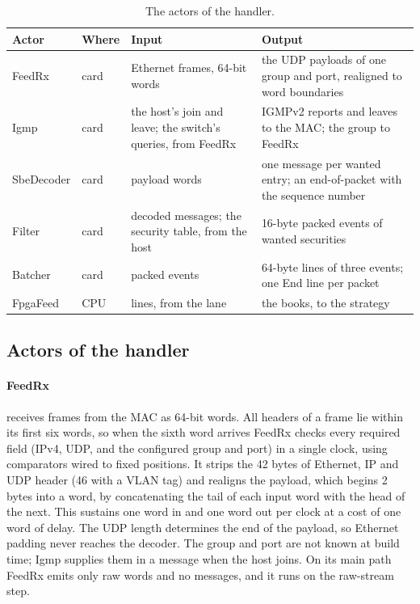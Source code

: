 \documentclass[11pt]{article}
\begin{document}
\begin{table}[h]
\centering
\caption{The actors of the handler.}
\label{tab:actors}
\small
\begin{tabular}{p{2.0cm} p{1.0cm} p{4.2cm} p{5.6cm}}
\toprule
Actor & Where & Input & Output \\
\midrule
FeedRx & card & Ethernet frames, 64-bit words & the UDP payloads of one group and port, realigned to word boundaries \\
Igmp & card & the host's join and leave; the switch's queries, from FeedRx & IGMPv2 reports and leaves to the MAC; the group to FeedRx \\
SbeDecoder & card & payload words & one message per wanted entry; an end-of-packet with the sequence number \\
Filter & card & decoded messages; the security table, from the host & 16-byte packed events of wanted securities \\
Batcher & card & packed events & 64-byte lines of three events; one End line per packet \\
FpgaFeed & CPU & lines, from the lane & the books, to the strategy \\
\bottomrule
\end{tabular}
\end{table}

\subsection{Actors of the handler}

\paragraph{FeedRx} receives frames from the MAC as 64-bit words. All headers of
a frame lie within its first six words, so when the sixth word arrives FeedRx
checks every required field (IPv4, UDP, and the configured group and port) in a
single clock, using comparators wired to fixed positions. It strips the 42
bytes of Ethernet, IP and UDP header (46 with a VLAN tag) and realigns the
payload, which begins 2 bytes into a word, by concatenating the tail of each
input word with the head of the next. This sustains one word in and one word
out per clock at a cost of one word of delay. The UDP length determines the end
of the payload, so Ethernet padding never reaches the decoder. The group and
port are not known at build time; Igmp supplies them in a message when the host
joins. On its main path FeedRx emits only raw words and no messages, and it
runs on the raw-stream step.
\end{document}
